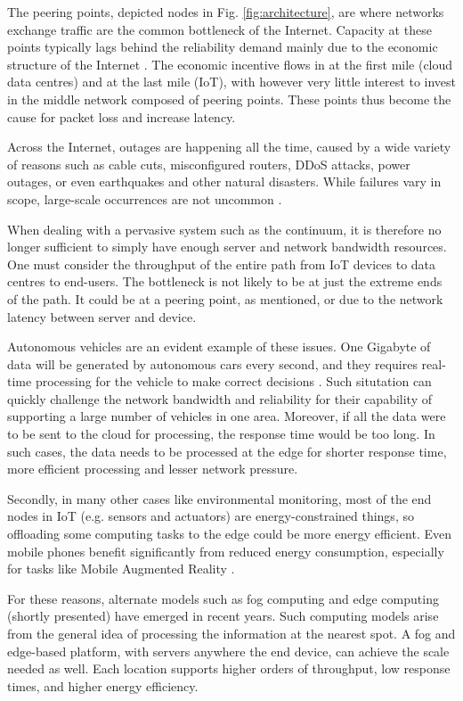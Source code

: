The peering points, depicted nodes in Fig. \ref{fig:architecture}, are where networks exchange traffic are the common bottleneck of the Internet. Capacity at these points typically lags behind the reliability demand mainly due to the economic structure of the Internet \cite{akamai}. The economic incentive flows in at the first mile (cloud data centres) and at the last mile (IoT), with however very little interest to invest in the middle network composed of peering points. These points thus become the cause for packet loss and increase latency.

Across the Internet, outages are happening all the time, caused by a wide variety of reasons such as cable cuts, misconfigured routers, DDoS attacks, power outages, or even earthquakes and other natural disasters. While failures vary in scope, large-scale occurrences are not uncommon \cite{aws-outage}.

When dealing with a pervasive system such as the continuum, it is therefore no longer sufficient to simply have enough server and network bandwidth resources. One must consider the throughput of the entire path from IoT devices to data centres to end-users. The bottleneck is not likely to be at just the extreme ends of the path. It could be at a peering point, as mentioned, or due to the network latency between server and device. 

Autonomous vehicles are an evident example of these issues. One Gigabyte of data will be generated by autonomous cars every second, and they requires real-time processing for the vehicle to make correct decisions \cite{edge-computing-vision-challenges}. Such situtation can quickly challenge the network bandwidth and reliability for their capability of supporting a large number of vehicles in one area. Moreover, if all the data were to be sent to the cloud for processing, the response time would be too long. In such cases, the data needs to be processed at the edge for shorter response time, more efficient processing and lesser network pressure.

Secondly, in many other cases like environmental monitoring, most of the end nodes in IoT (e.g. sensors and actuators) are energy-constrained things, so offloading some computing tasks to the edge could be more energy efficient. Even mobile phones benefit significantly from reduced energy consumption, especially for tasks like Mobile Augmented Reality \cite{mobile-augmented-reality}.

For these reasons, alternate models such as fog computing and edge computing (shortly presented) have emerged in recent years. Such computing models arise from the general idea of processing the information at the nearest spot. A fog and edge-based platform, with servers anywhere the end device, can achieve the scale needed as well. Each location supports higher orders of throughput, low response times, and higher energy efficiency.

